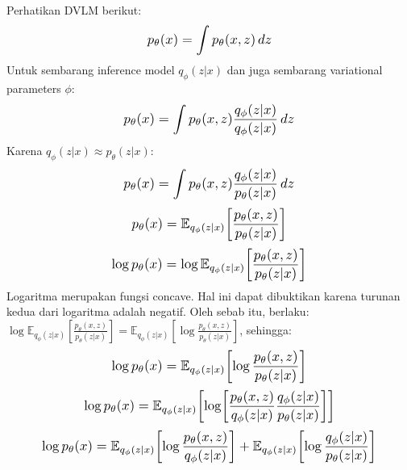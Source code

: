 \documentclass{article}
\newcommand*{\Scale}[2][4]{\scalebox{#1}{\ensuremath{#2}}}
\begin{document}
Perhatikan DVLM berikut:
\begin{equation}
\Scale[1.2]{ \displaystyle p_\theta(x) = \int p_\theta(x,z) \,dz }
\end{equation}
Untuk sembarang inference model $ q_\phi(z|x) $ dan juga sembarang variational parameters $ \phi $:
\begin{equation}
\Scale[1.2]{ \displaystyle p_\theta(x) = \int p_\theta(x,z) \frac{q_\phi(z|x)}{q_\phi(z|x)} \,dz }
\end{equation}
Karena $ q_\phi(z|x) \approx p_\theta(z|x) $:
\begin{equation}
\Scale[1.2]{ \displaystyle p_\theta(x) = \int p_\theta(x,z) \frac{q_\phi(z|x)}{p_\theta(z|x)} \,dz }
\end{equation}
\begin{equation}
\Scale[1.2]{ \displaystyle p_\theta(x) = \mathbb{E}_{q_\phi(z|x)} \left[ \frac{p_\theta(x,z)}{p_\theta(z|x)} \right] }
\end{equation}
\begin{equation}
\Scale[1.2]{\displaystyle \log p_\theta(x) = \log \mathbb{E}_{q_\phi(z|x)} \left[ \frac{p_\theta(x,z)}{p_\theta(z|x)} \right] }
\end{equation}
Logaritma merupakan fungsi concave. Hal ini dapat dibuktikan karena turunan kedua dari logaritma adalah negatif. Oleh sebab itu, berlaku: $ \log \mathbb{E}_{q_\phi(z|x)} \left[ \frac{p_\theta(x,z)}{p_\theta(z|x)} \right] = \mathbb{E}_{q_\phi(z|x)} \left[ \log \frac{p_\theta(x,z)}{p_\theta(z|x)} \right] $, sehingga:
\begin{equation}
\Scale[1.2]{\displaystyle \log p_\theta(x) = \mathbb{E}_{q_\phi(z|x)} \left[ \log \frac{p_\theta(x,z)}{p_\theta(z|x)} \right] }
\end{equation}
\begin{equation}
\Scale[1.2]{\displaystyle \log p_\theta(x) = \mathbb{E}_{q_\phi(z|x)} 
\left[ \log \left[ \frac{p_\theta(x,z)}{q_\phi(z|x)} \frac{q_\phi(z|x)}{p_\theta(z|x)} \right] \right] }
\end{equation}
\begin{equation} \label{eq:13}
\Scale[1.2]{\displaystyle \log p_\theta(x) = 
\mathbb{E}_{q_\phi(z|x)} \left[ \log \frac{p_\theta(x,z)}{q_\phi(z|x)} \right]
+
\mathbb{E}_{q_\phi(z|x)} \left[ \log \frac{q_\phi(z|x)}{p_\theta(z|x)} \right]
}
\end{equation}
\end{document}
